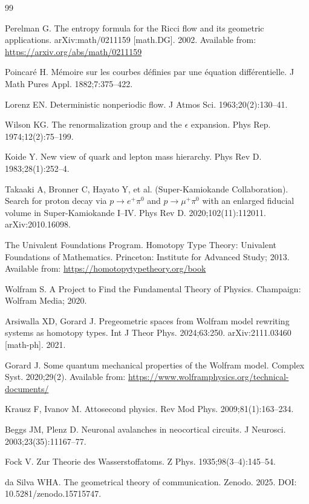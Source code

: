 \documentclass[12pt]{article}
\begin{document}
\begin{thebibliography}{99}\raggedright

Perelman G. The entropy formula for the Ricci flow and its geometric applications. arXiv:math/0211159 [math.DG]. 2002. Available from: \url{https://arxiv.org/abs/math/0211159}

Poincar\'e H. M\'emoire sur les courbes d\'efinies par une \'equation diff\'erentielle. J Math Pures Appl. 1882;7:375--422.

Lorenz EN. Deterministic nonperiodic flow. J Atmos Sci. 1963;20(2):130--41.

Wilson KG. The renormalization group and the $\epsilon$ expansion. Phys Rep. 1974;12(2):75--199.

Koide Y. New view of quark and lepton mass hierarchy. Phys Rev D. 1983;28(1):252--4.

Takaaki A, Bronner C, Hayato Y, et al. (Super-Kamiokande Collaboration). Search for proton decay via $p \to e^+\pi^0$ and $p \to \mu^+\pi^0$ with an enlarged fiducial volume in Super-Kamiokande I--IV. Phys Rev D. 2020;102(11):112011. arXiv:2010.16098.

The Univalent Foundations Program. Homotopy Type Theory: Univalent Foundations of Mathematics. Princeton: Institute for Advanced Study; 2013. Available from: \url{https://homotopytypetheory.org/book}

Wolfram S. A Project to Find the Fundamental Theory of Physics. Champaign: Wolfram Media; 2020.

Arsiwalla XD, Gorard J. Pregeometric spaces from Wolfram model rewriting systems as homotopy types. Int J Theor Phys. 2024;63:250. arXiv:2111.03460 [math-ph]. 2021.

Gorard J. Some quantum mechanical properties of the Wolfram model. Complex Syst. 2020;29(2). Available from: \url{https://www.wolframphysics.org/technical-documents/}

Krausz F, Ivanov M. Attosecond physics. Rev Mod Phys. 2009;81(1):163--234.

Beggs JM, Plenz D. Neuronal avalanches in neocortical circuits. J Neurosci. 2003;23(35):11167--77.

Fock V. Zur Theorie des Wasserstoffatoms. Z Phys. 1935;98(3--4):145--54.

da Silva WHA. The geometrical theory of communication. Zenodo. 2025. DOI: 10.5281/zenodo.15715747.

\end{thebibliography}
\end{document}
